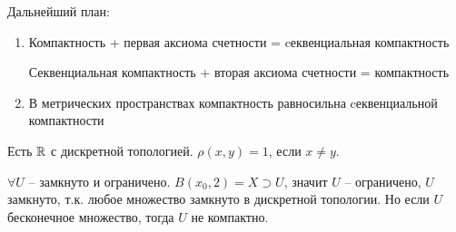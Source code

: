 \documentclass[main]{subfiles}
\begin{document}
Дальнейший план:
\begin{enumerate}
    \item Компактность + первая аксиома счетности = cеквенциальная компактность

          Секвенциальная компактность + вторая аксиома счетности = компактность
    \item В метрических пространствах компактность равносильна cеквенциальной компактности
\end{enumerate}
\begin{example}
    Есть $\mathbb{R}$ с дискретной топологией. $\rho(x,y) = 1$, если $x \neq y$.

    $\forall U$ -- замкнуто и ограничено. $B(x_0, 2) = X \supset U$, значит $U$ -- ограничено,
    $U$ замкнуто, т.к. любое множество замкнуто в дискретной топологии.
    Но если $U$ бесконечное множество, тогда $U$ не компактно.
\end{example}
\end{document}
